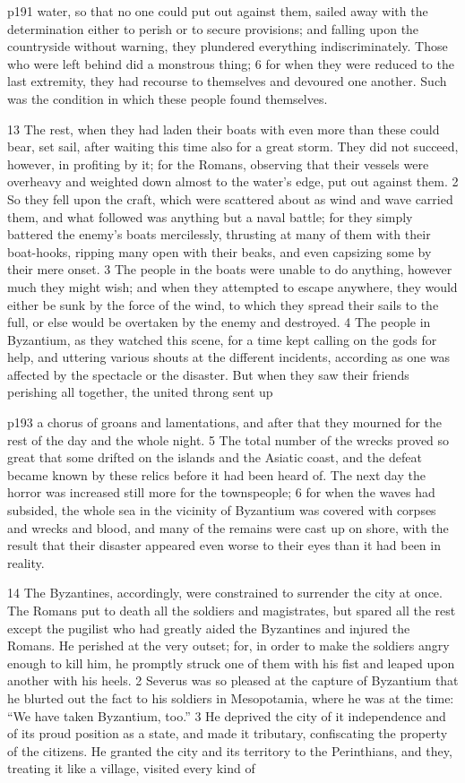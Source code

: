 p191 water, so that no one could put out against them, sailed away with the determination either to perish or to secure provisions; and falling upon the countryside without warning, they plundered everything indiscriminately. Those who were left behind did a monstrous thing; 6 for when they were reduced to the last extremity, they had recourse to themselves and devoured one another. Such was the condition in which these people found themselves.

13
The rest, when they had laden their boats with even more than these could bear, set sail, after waiting this time also for a great storm. They did not succeed, however, in profiting by it; for the Romans, observing that their vessels were overheavy and weighted down almost to the water's edge, put out against them. 2 So they fell upon the craft, which were scattered about as wind and wave carried them, and what followed was anything but a naval battle; for they simply battered the enemy's boats mercilessly, thrusting at many of them with their boat-hooks, ripping many open with their beaks, and even capsizing some by their mere onset. 3 The people in the boats were unable to do anything, however much they might wish; and when they attempted to escape anywhere, they would either be sunk by the force of the wind, to which they spread their sails to the full, or else would be overtaken by the enemy and destroyed. 4 The people in Byzantium, as they watched this scene, for a time kept calling on the gods for help, and uttering various shouts at the different incidents, according as one was affected by the spectacle or the disaster. But when they saw their friends perishing all together, the united throng sent up

p193 a chorus of groans and lamentations, and after that they mourned for the rest of the day and the whole night. 5 The total number of the wrecks proved so great that some drifted on the islands and the Asiatic coast, and the defeat became known by these relics before it had been heard of. The next day the horror was increased still more for the townspeople; 6 for when the waves had subsided, the whole sea in the vicinity of Byzantium was covered with corpses and wrecks and blood, and many of the remains were cast up on shore, with the result that their disaster appeared even worse to their eyes than it had been in reality.

14
The Byzantines, accordingly, were constrained to surrender the city at once. The Romans put to death all the soldiers and magistrates, but spared all the rest except the pugilist who had greatly aided the Byzantines and injured the Romans. He perished at the very outset; for, in order to make the soldiers angry enough to kill him, he promptly struck one of them with his fist and leaped upon another with his heels. 2 Severus was so pleased at the capture of Byzantium that he blurted out the fact to his soldiers in Mesopotamia, where he was at the time: ``We have taken Byzantium, too.'' 3 He deprived the city of it independence and of its proud position as a state, and made it tributary, confiscating the property of the citizens. He granted the city and its territory to the Perinthians, and they, treating it like a village, visited every kind of

